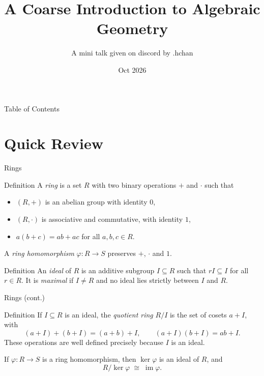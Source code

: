 \documentclass[aspectratio=169,10pt]{beamer}
\title{A Coarse Introduction to Algebraic Geometry}
\author{A mini talk given on discord by .hchan}
\date{Oct 2026}
\begin{document}
\maketitle

\begin{frame}{Table of Contents}
    \tableofcontents
\end{frame}

\section{Quick Review}

\begin{frame}{Rings}
    \begin{block}{Definition}
        A \textit{ring} is a set $R$ with two binary operations $+$ and $\cdot$ such that
        \begin{itemize}
            \item $(R,+)$ is an abelian group with identity $0$,
            \item $(R,\cdot)$ is associative and commutative, with identity $1$,
            \item $a(b+c) = ab + ac$ for all $a,b,c \in R$.
        \end{itemize}
        A \textit{ring homomorphism} $\varphi : R \to S$ preserves $+$, $\cdot$ and $1$.
    \end{block}
    \begin{block}{Definition}
        An \textit{ideal} of $R$ is an additive subgroup $I \subseteq R$ such that $rI \subseteq I$ for all $r \in R$. It is \textit{maximal} if $I \neq R$ and no ideal lies strictly between $I$ and $R$.
    \end{block}
\end{frame}

\begin{frame}{Rings (cont.)}
    \begin{block}{Definition}
        If $I \subseteq R$ is an ideal, the \textit{quotient ring} $R/I$ is the set of cosets $a + I$, with
        \[
            (a+I) + (b+I) = (a+b) + I, \qquad (a+I)(b+I) = ab + I.
        \]
        These operations are well defined precisely because $I$ is an ideal.
    \end{block}
    \begin{theorem}
        If $\varphi : R \to S$ is a ring homomorphism, then $\ker \varphi$ is an ideal of $R$, and
        \[
            R / \ker \varphi \;\cong\; \operatorname{im} \varphi.
        \]
    \end{theorem}
\end{frame}
\end{document}

